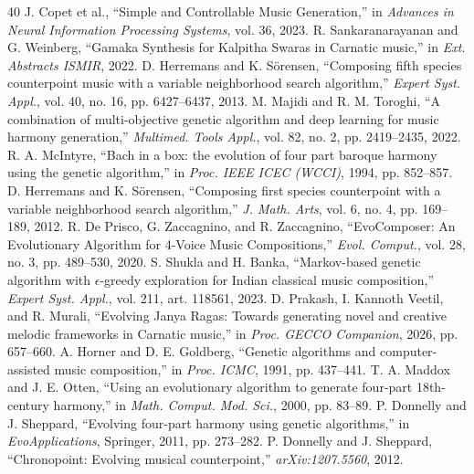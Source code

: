 \documentclass[12pt,a4paper]{report}
\begin{document}
\newpage
\begin{thebibliography}{40}
 J. Copet et al., ``Simple and Controllable Music Generation,'' in \emph{Advances in Neural Information Processing Systems}, vol. 36, 2023.
 R. Sankaranarayanan and G. Weinberg, ``Gamaka Synthesis for Kalpitha Swaras in Carnatic music,'' in \emph{Ext. Abstracts ISMIR}, 2022.
 D. Herremans and K. S{\"o}rensen, ``Composing fifth species counterpoint music with a variable neighborhood search algorithm,'' \emph{Expert Syst. Appl.}, vol. 40, no. 16, pp. 6427--6437, 2013.
 M. Majidi and R. M. Toroghi, ``A combination of multi-objective genetic algorithm and deep learning for music harmony generation,'' \emph{Multimed. Tools Appl.}, vol. 82, no. 2, pp. 2419--2435, 2022.
 R. A. McIntyre, ``Bach in a box: the evolution of four part baroque harmony using the genetic algorithm,'' in \emph{Proc. IEEE ICEC (WCCI)}, 1994, pp. 852--857.
 D. Herremans and K. S{\"o}rensen, ``Composing first species counterpoint with a variable neighborhood search algorithm,'' \emph{J. Math. Arts}, vol. 6, no. 4, pp. 169--189, 2012.
 R. De Prisco, G. Zaccagnino, and R. Zaccagnino, ``EvoComposer: An Evolutionary Algorithm for 4-Voice Music Compositions,'' \emph{Evol. Comput.}, vol. 28, no. 3, pp. 489--530, 2020.
 S. Shukla and H. Banka, ``Markov-based genetic algorithm with $\epsilon$-greedy exploration for Indian classical music composition,'' \emph{Expert Syst. Appl.}, vol. 211, art. 118561, 2023.
 D. Prakash, I. Kannoth Veetil, and R. Murali, ``Evolving Janya Ragas: Towards generating novel and creative melodic frameworks in Carnatic music,'' in \emph{Proc. GECCO Companion}, 2026, pp. 657--660.
 A. Horner and D. E. Goldberg, ``Genetic algorithms and computer-assisted music composition,'' in \emph{Proc. ICMC}, 1991, pp. 437--441.
 T. A. Maddox and J. E. Otten, ``Using an evolutionary algorithm to generate four-part 18th-century harmony,'' in \emph{Math. Comput. Mod. Sci.}, 2000, pp. 83--89.
 P. Donnelly and J. Sheppard, ``Evolving four-part harmony using genetic algorithms,'' in \emph{EvoApplications}, Springer, 2011, pp. 273--282.
 P. Donnelly and J. Sheppard, ``Chronopoint: Evolving musical counterpoint,'' \emph{arXiv:1207.5560}, 2012.

\end{thebibliography}
\end{document}
